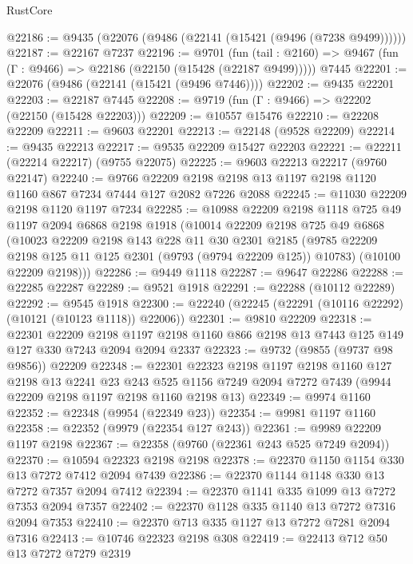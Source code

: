 \begin{lexlean}{RustCore}
\begin{coremodule}
@22186 := @9435 (@22076 (@9486 (@22141 (@15421 (@9496 (@7238 @9499))))))
@22187 := @22167 @7237
@22196 := @9701
    (fun (tail : @2160) => @9467 (fun (Γ : @9466) => @22186 (@22150 (@15428 (@22187 @9499)))))
    @7445
@22201 := @22076 (@9486 (@22141 (@15421 (@9496 @7446))))
@22202 := @9435 @22201
@22203 := @22187 @7445
@22208 := @9719 (fun (Γ : @9466) => @22202 (@22150 (@15428 @22203)))
@22209 := @10557 @15476
@22210 := @22208 @22209
@22211 := @9603 @22201
@22213 := @22148 (@9528 @22209)
@22214 := @9435 @22213
@22217 := @9535 @22209 @15427 @22203
@22221 := @22211 (@22214 @22217) (@9755 @22075)
@22225 := @9603 @22213 @22217 (@9760 @22147)
@22240 := @9766
    @22209
    @2198
    @2198
    @13
    @1197
    @2198
    @1120
    @1160
    @867
    @7234
    @7444
    @127
    @2082
    @7226
    @2088
@22245 := @11030 @22209 @2198 @1120 @1197 @7234
@22285 := @10988
    @22209
    @2198
    @1118
    @725
    @49
    @1197
    @2094
    @6868
    @2198
    @1918
    (@10014
      @22209
      @2198
      @725
      @49
      @6868
      (@10023
        @22209
        @2198
        @143
        @228
        @11
        @30
        @2301
        @2185
        (@9785 @22209 @2198 @125 @11 @125 @2301 (@9793 (@9794 @22209 @125)) @10783)
        (@10100 @22209 @2198)))
@22286 := @9449 @1118
@22287 := @9647 @22286
@22288 := @22285 @22287
@22289 := @9521 @1918
@22291 := @22288 (@10112 @22289)
@22292 := @9545 @1918
@22300 := @22240 (@22245 (@22291 (@10116 @22292) (@10121 (@10123 @1118)) @22006))
@22301 := @9810 @22209
@22318 := @22301
    @22209
    @2198
    @1197
    @2198
    @1160
    @866
    @2198
    @13
    @7443
    @125
    @149
    @127
    @330
    @7243
    @2094
    @2094
    @2337
@22323 := @9732 (@9855 (@9737 @98 @9856)) @22209
@22348 := @22301
    @22323
    @2198
    @1197
    @2198
    @1160
    @127
    @2198
    @13
    @2241
    @23
    @243
    @525
    @1156
    @7249
    @2094
    @7272
    @7439
    (@9944 @22209 @2198 @1197 @2198 @1160 @2198 @13)
@22349 := @9974 @1160
@22352 := @22348 (@9954 (@22349 @23))
@22354 := @9981 @1197 @1160
@22358 := @22352 (@9979 (@22354 @127 @243))
@22361 := @9989 @22209 @1197 @2198
@22367 := @22358 (@9760 (@22361 @243 @525 @7249 @2094))
@22370 := @10594 @22323 @2198 @2198
@22378 := @22370 @1150 @1154 @330 @13 @7272 @7412 @2094 @7439
@22386 := @22370 @1144 @1148 @330 @13 @7272 @7357 @2094 @7412
@22394 := @22370 @1141 @335 @1099 @13 @7272 @7353 @2094 @7357
@22402 := @22370 @1128 @335 @1140 @13 @7272 @7316 @2094 @7353
@22410 := @22370 @713 @335 @1127 @13 @7272 @7281 @2094 @7316
@22413 := @10746 @22323 @2198 @308
@22419 := @22413 @712 @50 @13 @7272 @7279 @2319

\end{coremodule}
\end{lexlean}
